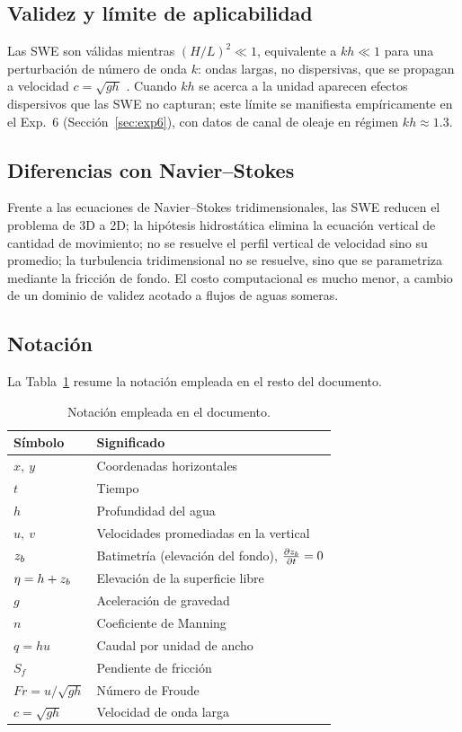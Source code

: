 \subsection{Validez y límite de aplicabilidad}

Las SWE son válidas mientras $(H/L)^2 \ll 1$, equivalente a $k h \ll 1$ para
una perturbación de número de onda $k$: ondas largas, no dispersivas, que se
propagan a velocidad $c = \sqrt{g h}$ \cite{leveque2002, vallis2017}. Cuando
$k h$ se acerca a la unidad aparecen efectos dispersivos que las SWE no
capturan; este límite se manifiesta empíricamente en el Exp.~6
(Sección~\ref{sec:exp6}), con datos de canal de oleaje en régimen
$k h \approx 1.3$.

\subsection{Diferencias con Navier--Stokes}

Frente a las ecuaciones de Navier--Stokes tridimensionales, las SWE reducen el
problema de 3D a 2D; la hipótesis hidrostática elimina la ecuación vertical de
cantidad de movimiento; no se resuelve el perfil vertical de velocidad sino su
promedio; la turbulencia tridimensional no se resuelve, sino que se parametriza
mediante la fricción de fondo. El costo computacional es mucho menor, a cambio
de un dominio de validez acotado a flujos de aguas someras.

\subsection{Notación}

La Tabla~\ref{tab:notacion} resume la notación empleada en el resto del
documento.

\begin{table}[H]
\centering
\caption{Notación empleada en el documento.}
\label{tab:notacion}
\begin{tabular}{ll}
\toprule
Símbolo & Significado \\
\midrule
$x,\ y$              & Coordenadas horizontales \\
$t$                  & Tiempo \\
$h$                  & Profundidad del agua \\
$u,\ v$              & Velocidades promediadas en la vertical \\
$z_b$                & Batimetría (elevación del fondo), $\frac{\partial z_b}{\partial t}=0$ \\
$\eta = h + z_b$     & Elevación de la superficie libre \\
$g$                  & Aceleración de gravedad \\
$n$                  & Coeficiente de Manning \\
$q = h u$            & Caudal por unidad de ancho \\
$S_f$                & Pendiente de fricción \\
$Fr = u/\sqrt{g h}$  & Número de Froude \\
$c = \sqrt{g h}$     & Velocidad de onda larga \\
\bottomrule
\end{tabular}
\end{table}
